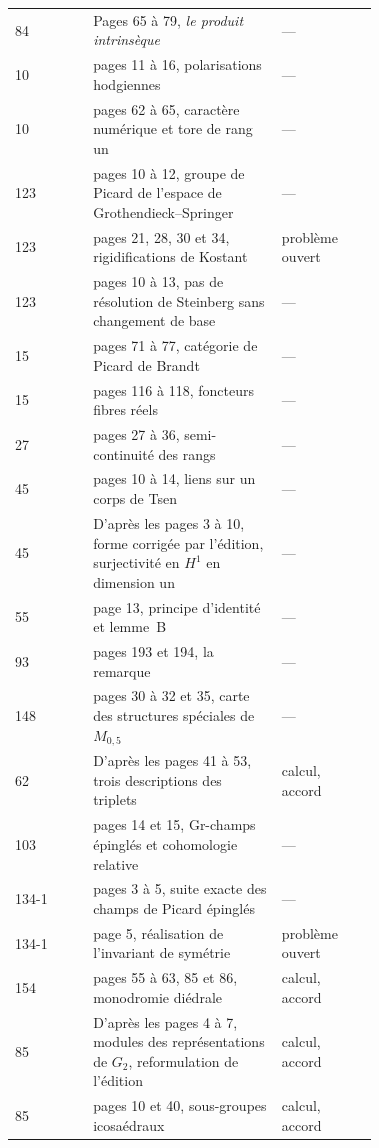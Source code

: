 {\begin{longtable}{@{}l>{\raggedright\arraybackslash}p{0.52\linewidth}>{\raggedright\arraybackslash}p{0.2\linewidth}r@{}}
84 & Pages 65 à 79, \emph{le produit intrinsèque} & --- & \pageref{nv:79}\\
10 & pages 11 à 16, polarisations hodgiennes & --- & \pageref{nv:80}\\
10 & pages 62 à 65, caractère numérique et tore de rang un & --- & \pageref{nv:81}\\
123 & pages 10 à 12, groupe de Picard de l'espace de Grothendieck--Springer & --- & \pageref{nv:82}\\
123 & pages 21, 28, 30 et 34, rigidifications de Kostant & problème ouvert & \pageref{nv:83}\\
123 & pages 10 à 13, pas de résolution de Steinberg sans changement de base & --- & \pageref{nv:84}\\
15 & pages 71 à 77, catégorie de Picard de Brandt & --- & \pageref{nv:85}\\
15 & pages 116 à 118, foncteurs fibres réels & --- & \pageref{nv:86}\\
27 & pages 27 à 36, semi-continuité des rangs & --- & \pageref{nv:87}\\
45 & pages 10 à 14, liens sur un corps de Tsen & --- & \pageref{nv:88}\\
45 & D'après les pages 3 à 10, forme corrigée par l'édition, surjectivité en $H^1$ en dimension un & --- & \pageref{nv:89}\\
55 & page 13, principe d'identité et lemme~B & --- & \pageref{nv:90}\\
93 & pages 193 et 194, la remarque & --- & \pageref{nv:91}\\
148 & pages 30 à 32 et 35, carte des structures spéciales de $M_{0,5}$ & --- & \pageref{nv:92}\\
62 & D'après les pages 41 à 53, trois descriptions des triplets & calcul, accord & \pageref{nv:93}\\
103 & pages 14 et 15, Gr-champs épinglés et cohomologie relative & --- & \pageref{nv:94}\\
134-1 & pages 3 à 5, suite exacte des champs de Picard épinglés & --- & \pageref{nv:95}\\
134-1 & page 5, réalisation de l'invariant de symétrie & problème ouvert & \pageref{nv:96}\\
154 & pages 55 à 63, 85 et 86, monodromie diédrale & calcul, accord & \pageref{nv:97}\\
85 & D'après les pages 4 à 7, modules des représentations de $G_2$, reformulation de l'édition & calcul, accord & \pageref{nv:98}\\
85 & pages 10 et 40, sous-groupes icosaédraux & calcul, accord & \pageref{nv:99}\\

\end{longtable}}
